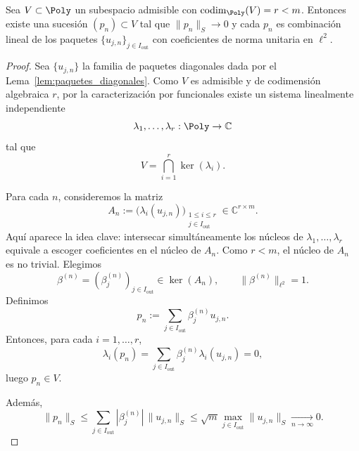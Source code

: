 \begin{lem}\label{lem:imposicion_restricciones}
	Sea $V\subset\Poly$ un subespacio admisible con $\operatorname{codim}_{\Poly}(V)=r<m$.
	Entonces existe una sucesión $(p_n)\subset V$ tal que $\|p_n\|_S\to0$ y cada $p_n$
	es combinación lineal de los paquetes $\{u_{j,n}\}_{j\in I_{\mathrm{out}}}$
	con coeficientes de norma unitaria en $\ell^2$.
\end{lem}
\begin{proof}
	Sea $\{u_{j,n}\}$ la familia de paquetes diagonales dada por el Lema~\ref{lem:paquetes_diagonales}.
	Como $V$ es admisible y de codimensión algebraica $r$, por la caracterización por
	funcionales existe un sistema linealmente independiente
	\[
		\lambda_1,\dots,\lambda_r:\Poly\to\mathbb C
	\]
	tal que
	\[
		V=\bigcap_{i=1}^r \ker(\lambda_i).
	\]

	Para cada $n$, consideremos la matriz
	\[
		A_n:=\bigl(\lambda_i(u_{j,n})\bigr)_{
		\substack{1\le i\le r\\ j\in I_{\mathrm{out}}}}
		\in \mathbb C^{r\times m}.
	\]
	Aquí aparece la idea clave: intersecar simultáneamente los núcleos de
	$\lambda_1,\dots,\lambda_r$ equivale a escoger coeficientes en el núcleo de $A_n$.
	Como $r<m$, el núcleo de $A_n$ es no trivial. Elegimos
	\[
		\beta^{(n)}=(\beta_j^{(n)})_{j\in I_{\mathrm{out}}}\in \ker(A_n),
		\qquad
		\|\beta^{(n)}\|_{\ell^2}=1.
	\]
	Definimos
	\[
		p_n:=\sum_{j\in I_{\mathrm{out}}}\beta_j^{(n)}u_{j,n}.
	\]
	Entonces, para cada $i=1,\dots,r$,
	\[
		\lambda_i(p_n)=\sum_{j\in I_{\mathrm{out}}}\beta_j^{(n)}\lambda_i(u_{j,n})=0,
	\]
	luego $p_n\in V$.

	Además,
	\[
		\|p_n\|_S
		\le
		\sum_{j\in I_{\mathrm{out}}} |\beta_j^{(n)}|\,\|u_{j,n}\|_S
		\le
		\sqrt m \max_{j\in I_{\mathrm{out}}}\|u_{j,n}\|_S
		\xrightarrow[n\to\infty]{}0.
	\]
\end{proof}

